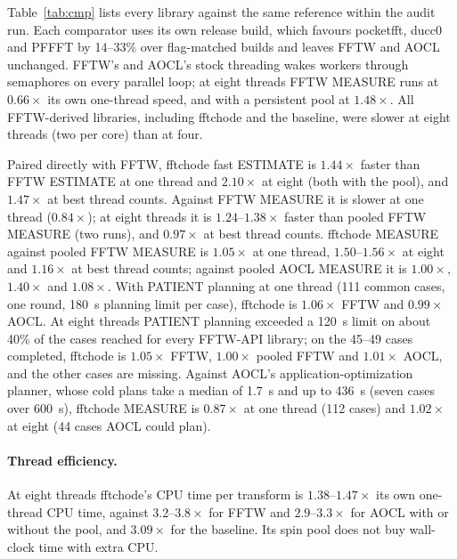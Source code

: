 \documentclass[10pt]{article}
\theoremstyle{definition}
\begin{document}
Table~\ref{tab:cmp} lists every library against the same reference within the audit run. Each comparator uses its own release build, which favours pocketfft, ducc0 and PFFFT by 14--33\% over flag-matched builds and leaves FFTW and AOCL unchanged. FFTW's and AOCL's stock threading wakes workers through semaphores on every parallel loop; at eight threads FFTW MEASURE runs at $0.66\times$ its own one-thread speed, and with a persistent pool at $1.48\times$. All FFTW-derived libraries, including fftchode and the baseline, were slower at eight threads (two per core) than at four.

Paired directly with FFTW, fftchode fast ESTIMATE is $1.44\times$ faster than FFTW ESTIMATE at one thread and $2.10\times$ at eight (both with the pool), and $1.47\times$ at best thread counts. Against FFTW MEASURE it is slower at one thread ($0.84\times$); at eight threads it is $1.24$--$1.38\times$ faster than pooled FFTW MEASURE (two runs), and $0.97\times$ at best thread counts. fftchode MEASURE against pooled FFTW MEASURE is $1.05\times$ at one thread, $1.50$--$1.56\times$ at eight and $1.16\times$ at best thread counts; against pooled AOCL MEASURE it is $1.00\times$, $1.40\times$ and $1.08\times$. With PATIENT planning at one thread (111 common cases, one round, 180~s planning limit per case), fftchode is $1.06\times$ FFTW and $0.99\times$ AOCL. At eight threads PATIENT planning exceeded a 120~s limit on about 40\% of the cases reached for every FFTW-API library; on the 45--49 cases completed, fftchode is $1.05\times$ FFTW, $1.00\times$ pooled FFTW and $1.01\times$ AOCL, and the other cases are missing. Against AOCL's application-optimization planner, whose cold plans take a median of 1.7~s and up to 436~s (seven cases over 600~s), fftchode MEASURE is $0.87\times$ at one thread (112 cases) and $1.02\times$ at eight (44 cases AOCL could plan).

\paragraph{Thread efficiency.} At eight threads fftchode's CPU time per transform is $1.38$--$1.47\times$ its own one-thread CPU time, against $3.2$--$3.8\times$ for FFTW and $2.9$--$3.3\times$ for AOCL with or without the pool, and $3.09\times$ for the baseline. Its spin pool does not buy wall-clock time with extra CPU.
\end{document}
